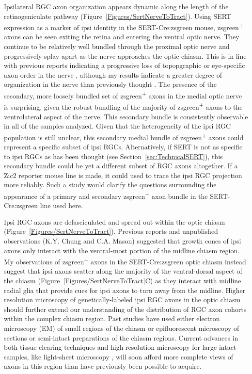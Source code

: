 Ipsilateral RGC axon organization appears dynamic along the length of the retinogeniculate pathway (Figure~\ref{Figures/SertNerveToTract}).
Using SERT expression as a marker of ipsi identity in the SERT-Cre:zsgreen mouse, zsgreen\textsuperscript{+} axons can be seen exiting the retina and entering the ventral optic nerve.
They continue to be relatively well bundled through the proximal optic nerve and progressively splay apart as the nerve approaches the optic chiasm.
This is in line with previous reports indicating a progressive loss of topopgraphic or eye-specific axon order in the nerve \cite{colello1990early,chan1994changes,chan1999changes}, although my results indicate a greater degree of organization in the nerve than previously thought \cite{baker1989distribution,colello1990early}.
The presence of the secondary, more loosely bundled set of zsgreen\textsuperscript{+} axons in the medial optic nerve is surprising, given the robust bundling of the majority of zsgreen\textsuperscript{+} axons to the ventrolateral aspect of the nerve.
This secondary bundle is consistently observable in all of the samples analyzed.
Given that the heterogeneity of the ipsi RGC population is still unclear, this secondary medial bundle of zsgreen\textsuperscript{+} axons could represent a specific subset of ipsi RGCs.
Alternatively, if SERT is not as specific to ipsi RGCs as has been thought (see Section~\ref{sec:TechnicalSERT}), this secondary bundle could be yet a different subset of RGC axons altogether.
If a Zic2 reporter mouse line is made, it could used to trace the ipsi RGC projection more reliably.
Such a study would clarify the questions surrounding the appearance of a primary and secondary zsgreen\textsuperscript{+} axon bundle in the SERT-Cre:zsgreen line used here.

Ipsi RGC axons are defasciculated and spread out within the optic chiasm (Figure~\ref{Figures/SertNerveToTract}).
Previous reports \cite{colello1997changing} and unpublished observations (K.Y. Chung and C.A. Mason) suggested that growth cones of ipsi axons only interact with the ventral-most portion of the midline chiasm region.
My observations of zsgreen\textsuperscript{+} axons in the SERT-Cre:zsgreen optic chiasm instead suggest that ipsi axons scatter along the majority of the ventral-dorsal aspect of the chiasm (Figure~\ref{Figures/SertNerveToTract}C) as they interact with midline radial glia that provide cues for ipsi axons to turn away from the midline.
Higher resolution microscopy of genetically-labeled ipsi RGC axons in the optic chiasm should further extend our understanding of the distribution of RGC axon cohorts within the complex chiasm region.
Past studies have used either electron microscopy (EM) of small regions of the chiasm or epifluorescent microscopy of sections or semi-intact preparations of the chiasm regions. %
Current advances in both tissue clearing techniques \cite{tainaka2015chemical} and high-resolution microscopy for large intact samples, like light-sheet microscopy \cite{keller2015visualizing}, will soon afford more complete views of axons in this region than have previously been possible to acquire.

